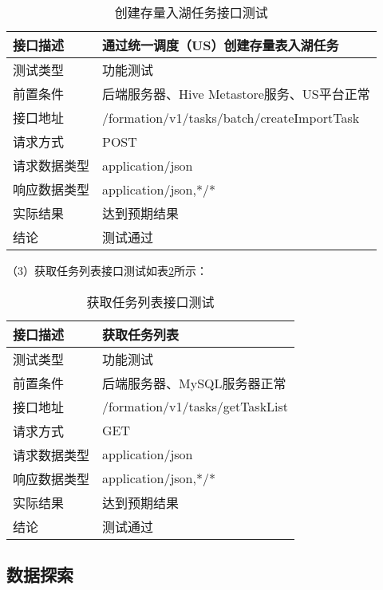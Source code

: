 \begin{table}[H]
  \centering
  \caption{创建存量入湖任务接口测试}
  \label{tab:exampletable10}
  \begin{tabular}{ll}
    \toprule
    接口描述         & 通过统一调度（US）创建存量表入湖任务         \\
    \midrule
    测试类型         & 功能测试         \\
    前置条件         & 后端服务器、Hive Metastore服务、US平台正常         \\
    接口地址         & /formation/v1/tasks/batch/createImportTask        \\
    请求方式         & POST      \\
    请求数据类型         & application/json     \\
    响应数据类型         & application/json,*/*           \\
    实际结果         & 达到预期结果           \\
    结论            & 测试通过           \\
    \bottomrule
  \end{tabular}
\end{table}

（3）获取任务列表接口测试如表\ref{tab:exampletable11}所示：

\begin{table}[H]
  \centering
  \caption{获取任务列表接口测试}
  \label{tab:exampletable11}
  \begin{tabular}{ll}
    \toprule
    接口描述         & 获取任务列表         \\
    \midrule
    测试类型         & 功能测试         \\
    前置条件         & 后端服务器、MySQL服务器正常         \\
    接口地址       & /formation/v1/tasks/getTaskList        \\
    请求方式         & GET      \\
    请求数据类型         & application/json     \\
    响应数据类型         & application/json,*/*           \\
    实际结果         & 达到预期结果           \\
    结论            & 测试通过           \\
    \bottomrule
  \end{tabular}
\end{table}

\subsection{数据探索}

